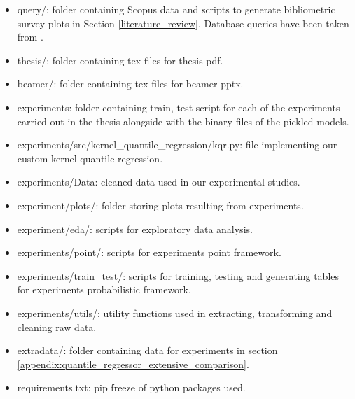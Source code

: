 \begin{itemize}
    \item query/: folder containing Scopus data and scripts to generate bibliometric survey plots in Section \ref{literature_review}. Database queries have been taken from \cite{nowotarski}.
    \item thesis/: folder containing tex files for thesis pdf.
    \item beamer/: folder containing tex files for beamer pptx. %
    \item experiments: folder containing train, test script for each of the experiments carried out in the thesis alongside with the binary files of the pickled models.
    \item experiments/src/kernel\_quantile\_regression/kqr.py: file implementing our custom kernel quantile regression.
    \item experiments/Data: cleaned data used in our experimental studies.
    \item experiment/plots/: folder storing plots resulting from experiments.
    \item experiment/eda/: scripts for exploratory data analysis.
    \item experiments/point/: scripts for experiments point framework.
    \item experiments/train\_test/: scripts for training, testing and generating tables for experiments probabilistic framework.
    \item experiments/utils/: utility functions used in extracting, transforming and cleaning raw data.
    \item extradata/: folder containing data for experiments in section \ref{appendix:quantile_regressor_extensive_comparison}.
    \item requirements.txt: pip freeze of python packages used.
\end{itemize}
